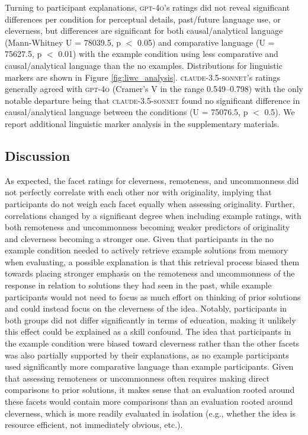 
Turning to participant explanations, \textsc{gpt-4o}'s ratings did not reveal significant differences per condition for perceptual details, past/future language use, or cleverness, but differences are significant for both causal/analytical language (Mann-Whitney U = 78039.5, p $<$ 0.05) and comparative language (U = 75627.5, p $<$ 0.01) with the example condition using less comparative and causal/analytical language than the no examples. Distributions for linguistic markers are shown in Figure \ref{fig:liwc_analysis}. \textsc{claude-3.5-sonnet}'s ratings generally agreed with \textsc{gpt-4o} (Cramer's V in the range 0.549--0.798) with the only notable departure being that \textsc{claude-3.5-sonnet} found no significant difference in causal/analytical language between the conditions (U = 75076.5, p $<$ 0.5). We report additional linguistic marker analysis in the supplementary materials.


\subsection{Discussion}
As expected, the facet ratings for cleverness, remoteness, and uncommonness did not perfectly correlate with each other nor with originality, implying that participants do not weigh each facet equally when assessing originality. Further, correlations changed by a significant degree when including example ratings, with both remoteness and uncommonness becoming weaker predictors of originality and cleverness becoming a stronger one. Given that participants in the no example condition needed to actively retrieve example solutions from memory when evaluating, a possible explanation is that this retrieval process biased them towards placing stronger emphasis on the remoteness and uncommonness of the response in relation to solutions they had seen in the past, while example participants would not need to focus as much effort on thinking of prior solutions and could instead focus on the cleverness of the idea. Notably, participants in both groups did not differ significantly in terms of education, making it unlikely this effect could be explained as a skill confound. The idea that participants in the example condition were biased toward cleverness rather than the other facets was also partially supported by their explanations, as no example participants used significantly more comparative language than example participants. Given that assessing remoteness or uncommonness often requires making direct comparisons to prior solutions, it makes sense that an evaluation rooted around these facets would contain more comparisons than an evaluation rooted around cleverness, which is more readily evaluated in isolation (e.g., whether the idea is resource efficient, not immediately obvious, etc.).